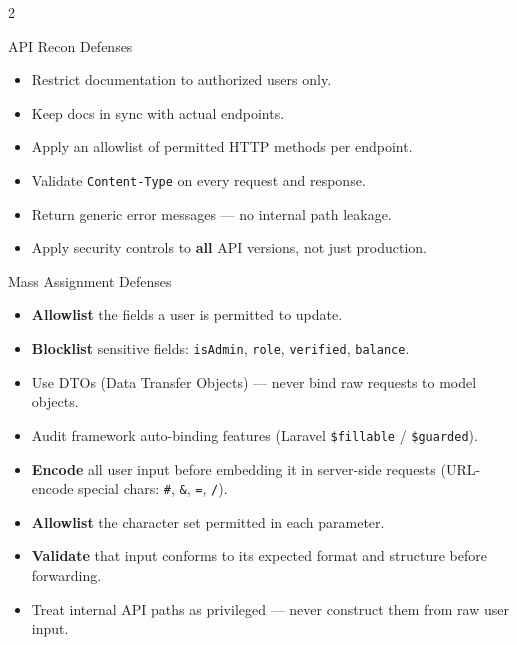 \documentclass[11pt]{article}
\begin{document}
\begin{multicols}{2}

\begin{pillarbox}{API Recon Defenses}
\begin{itemize}
  \item Restrict documentation to authorized users only.
  \item Keep docs in sync with actual endpoints.
  \item Apply an allowlist of permitted HTTP methods per endpoint.
  \item Validate \texttt{Content-Type} on every request and response.
  \item Return generic error messages --- no internal path leakage.
  \item Apply security controls to \textbf{all} API versions, not just production.
\end{itemize}
\end{pillarbox}

\columnbreak

\begin{pillarbox}{Mass Assignment Defenses}
\begin{itemize}
  \item \textbf{Allowlist} the fields a user is permitted to update.
  \item \textbf{Blocklist} sensitive fields: \texttt{isAdmin}, \texttt{role}, \texttt{verified}, \texttt{balance}.
  \item Use DTOs (Data Transfer Objects) --- never bind raw requests to model objects.
  \item Audit framework auto-binding features (Laravel \texttt{\$fillable} / \texttt{\$guarded}).
\end{itemize}
\end{pillarbox}

\end{multicols}

\begin{notebox}
\begin{itemize}
  \item \textbf{Encode} all user input before embedding it in server-side requests (URL-encode special chars: \texttt{\#}, \texttt{\&}, \texttt{=}, \texttt{/}).
  \item \textbf{Allowlist} the character set permitted in each parameter.
  \item \textbf{Validate} that input conforms to its expected format and structure before forwarding.
  \item Treat internal API paths as privileged --- never construct them from raw user input.
\end{itemize}
\end{notebox}
\end{document}

